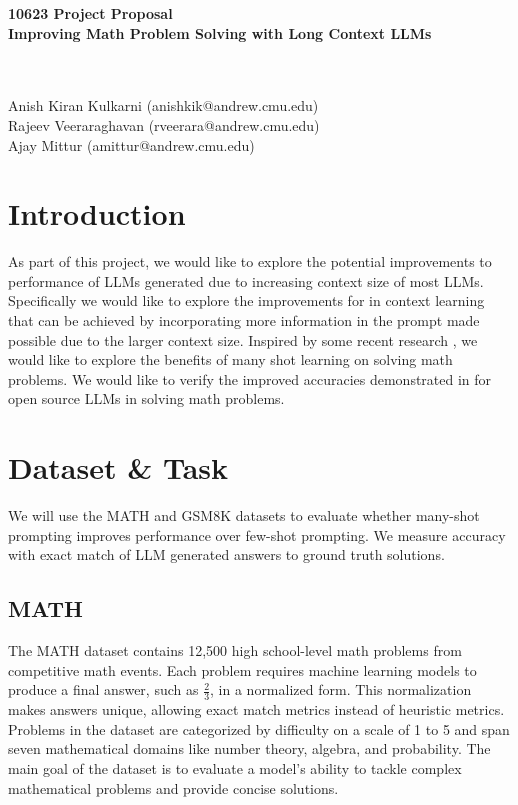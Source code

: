 \documentclass{article}
\title{\textbf{}}
\author{}
\date{}
\begin{document}
\Large
\noindent
\textbf{10623 Project Proposal}\\
\textbf{Improving Math Problem Solving with Long Context LLMs}

\normalsize
\\
\noindent
\\
Anish Kiran Kulkarni (anishkik@andrew.cmu.edu) \\ Rajeev Veeraraghavan (rveerara@andrew.cmu.edu)\\ Ajay Mittur (amittur@andrew.cmu.edu)

\section{Introduction}

As part of this project, we would like to explore the potential improvements to performance of LLMs generated due to increasing context size of most LLMs. Specifically we would like to explore the improvements for in context learning that can be achieved by incorporating more information in the prompt made possible due to the larger context size. Inspired  by some recent research \cite{agarwal2024manyshotincontextlearning}, we would like to explore the benefits of many shot learning on solving math problems. We would like to verify the improved accuracies demonstrated in \cite{agarwal2024manyshotincontextlearning} for open source LLMs in solving math problems. 

\section{Dataset \& Task}
We will use the MATH \cite{cobbe2021trainingverifierssolvemath} and GSM8K \cite{cobbe2021gsm8k} datasets to evaluate whether many-shot prompting improves performance over few-shot prompting. We measure accuracy with exact match of LLM generated answers to ground truth solutions.

\subsection{MATH}
The MATH dataset \cite{hendrycksmath2021} contains 12,500 high school-level math problems from competitive math events. Each problem requires machine learning models to produce a final answer, such as $\frac{2}{3}$, in a normalized form. This normalization makes answers unique, allowing exact match metrics instead of heuristic metrics. Problems in the dataset are categorized by difficulty on a scale of 1 to 5 and span seven mathematical domains like number theory, algebra, and probability. The main goal of the dataset is to evaluate a model’s ability to tackle complex mathematical problems and provide concise solutions.
\end{document}
